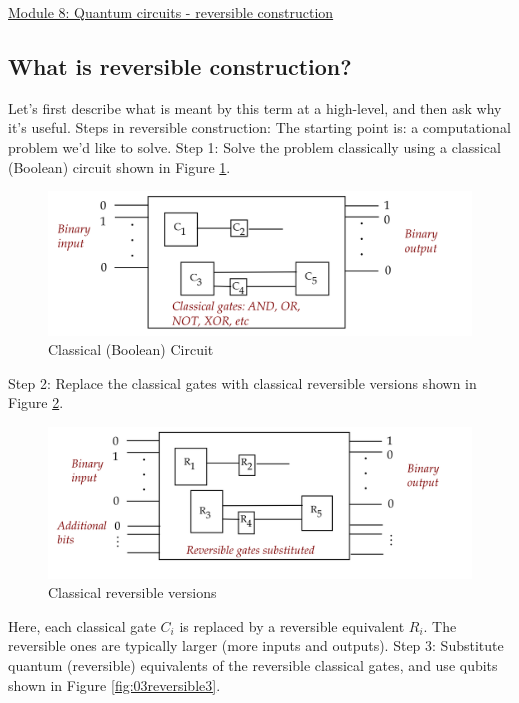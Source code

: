 \documentclass[main.tex]{subfiles}
\begin{document}
\href{https://www2.seas.gwu.edu/~simhaweb/quantum/modules/module8/module8.html}{Module 8: Quantum circuits - reversible construction}

\subsection{What is reversible construction?}

    Let's first describe what is meant by this term at a high-level, and then ask why it's useful. Steps in reversible construction: The starting point is: a computational problem we'd like to solve. Step 1: Solve the problem classically using a classical (Boolean) circuit shown in Figure \ref{fig:01reversible}.
    
    \begin{figure}
        \centering
        \includegraphics[width=5in]{notes/figs/n10/01reversible1.png}
        \caption{Classical (Boolean) Circuit}
        \label{fig:01reversible}
    \end{figure}
    
    Step 2: Replace the classical gates with classical reversible versions shown in Figure \ref{fig:02reversible2}.
    
    \begin{figure}
        \centering
        \includegraphics[width=5in]{notes/figs/n10/02reversible2.png}
        \caption{Classical reversible versions}
        \label{fig:02reversible2}
    \end{figure}
    
    Here, each classical gate $C_{i}$ is replaced by a reversible equivalent $R_{i}$. The reversible ones are typically larger (more inputs and outputs). Step 3: Substitute quantum (reversible) equivalents of the reversible classical gates, and use qubits shown in Figure \ref{fig:03reversible3}.
    
\end{document}
